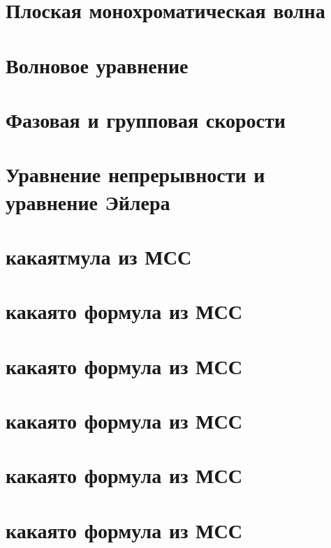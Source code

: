 \newcommand{\colontitulAutors}{astronom\_v\_cube}
\newcommand{\colontitulYear}{2023}
\newcommand{\colontitulEducationalSubject}{Физика волновых процессов}
\newcommand{\colontitulTeacher}{Петров Е. Ю.}




	\small
	\begin{multicols*}{2}
		\section{Плоская монохроматическая волна}

		\section{Волновое уравнение}

		\section{Фазовая и групповая скорости}

		\section{Уравнение непрерывности и уравнение Эйлера}

		\section{какаятмула из МСС}

		\section{какаято формула из МСС}

		\section{какаято формула из МСС}

		\section{какаято формула из МСС}

		\section{какаято формула из МСС}

		\section{какаято формула из МСС}


\end{multicols*}
